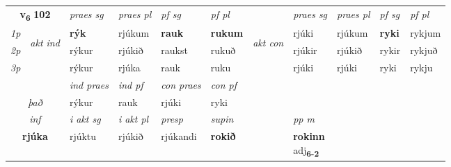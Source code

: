 \noindent
\begin{tabular}{lllllllllll} \toprule
\multicolumn{2}{c}{\textbf{v{\textsubscript{6}}} \Large{\textbf{102}}}  &  \textit{praes sg}  & \textit{praes pl}  &\textit{ pf sg} & \textit{pf pl} &  &  \textit{praes sg}  & \textit{praes pl}  & \textit{pf sg} & \textit{pf pl } \\*
	\cmidrule{3-6} \cmidrule{8-11}
 {\textit{1p}} & \multirow{3}{*}{\begin{turn}{90}\textit{akt ind}\end{turn}} & \textbf{rýk} & rjúkum & \textbf{rauk} & \textbf{rukum} & \multirow{3}{*}{\begin{turn}{90}\textit{akt con}\end{turn}} &rjúki & rjúkum & \textbf{ryki} & rykjum\\*
 {\textit{2p}} &  &  rýkur  & rjúkið & raukst & rukuð & & rjúkir & rjúkið & rykir & rykjuð \\*
{\textit{3p}} &  & rýkur & rjúka & rauk & ruku & & rjúki & rjúki& ryki & rykju \\*
\cmidrule{3-6} \cmidrule{8-11}

   & &  \textit{ind praes} & \textit{ind pf} & \textit{con praes} & \textit{con pf} \\*
\multicolumn{2}{c}{ \textit{það} } & rýkur & rauk & rjúki & ryki \\*

\cmidrule{3-8}
   \multicolumn{2}{c}{\textit{inf}}  & \textit{i akt sg} & \textit{i akt pl}   & \textit{presp} & \textit{supin}  && \textit{pp m} \\*
  \multicolumn{2}{c}{\textbf{rjúka}} & rjúktu  & rjúkið   & rjúkandi &  \textbf{rokið}  && \specialcell{\textbf{rokinn} \\ adj\textbf{\textsubscript{6-2}}} \\*
\end{tabular}

